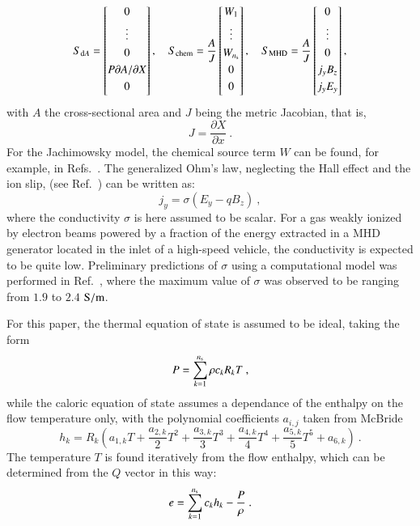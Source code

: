 \documentclass[oneside,10pt,onecolumn]{waflreport}
\newcommand{\ns}{{{n}_{\rm s}}}
\newcommand{\alb}{\vspace{0.1cm}\\} %
\newcommand{\Sda}{S_{{\rm d}A}}
\newcommand{\Schem}{S_{\rm chem}}
\newcommand{\Smhd}{S_{\rm MHD}}
\begin{document}
\begin{equation}
  \Sda=\left[
      \begin{array}{@{}c@{}}
      0 \alb
      \vdots \alb
      0 \alb
      P \partial A / \partial X\alb
      0 \alb
      \end{array}
   \right],~~~~
  \Schem=
   \frac{A}{J}\left[
      \begin{array}{@{}c@{}}
      W_1 \alb
      \vdots \alb
      W_\ns \alb
      0\alb
      0\alb
      \end{array}
   \right],~~~~
  \Smhd=
   \frac{A}{J}\left[
      \begin{array}{@{}c@{}}
      0 \alb
      \vdots \alb
      0 \alb
      j_y B_z\alb
      j_y E_y \alb
      \end{array}
   \right],
\end{equation}
%
with $A$ the cross-sectional area and $J$ being the metric Jacobian, that is,
%
\begin{equation}
  J=\frac{\partial X}{\partial x}~.
  \label{eqn:J}
\end{equation}
%
For the Jachimowsky model, the chemical source term $W$ can be found, for example,
in Refs.\ \cite{thesis:1998:parent,book:1989:anderson}.
The generalized Ohm's law, neglecting the Hall effect and the ion slip, (see Ref.\
\cite{aiaabook:2001:vatazhin,book:1965:sutton}) can be written as:
%
\begin{equation}
  j_y=\sigma \left( E_y - q B_z \right)~,
  \label{eqn:j}
\end{equation}
%
where the conductivity $\sigma$ is here assumed to be scalar. For a gas weakly
ionized by electron beams powered by a fraction of the energy extracted in
a MHD generator located in the inlet of a high-speed vehicle, the conductivity
is expected to be quite low. Preliminary predictions of $\sigma$ using a computational
model was performed in Ref.\ \cite{aiaa:2002:macheret}, where the maximum value
of $\sigma$ was observed to be ranging from $1.9$ to $2.4$ $\rm S/m$.

For this paper, the thermal equation of state is assumed to be ideal, taking the form
%
\begin{equation}
  P=\sum_{k=1}^\ns \rho c_k R_k T~,
  \label{eqn:NS_state}
\end{equation}
%
while the caloric equation of state assumes a dependance of the enthalpy on
the flow temperature only, with the polynomial coefficients $a_{i,j}$
taken from McBride \cite{nasa:1993:mcbride}
%
\begin{equation}
  h_k = R_k \left( a_{1,k} T + \frac{a_{2,k}}{2} T^2 + \frac{a_{3,k}}{3} T^3
                  + \frac{a_{4,k}}{4} T^4 +\frac{a_{5,k}}{5} T^5 + a_{6,k}\right)~.
  \label{eqn:NS_caloric_state}
\end{equation}
%
The temperature $T$ is found iteratively from the flow enthalpy, which can be
determined from the $Q$ vector in this way:
%
\begin{equation}
  e=\sum_{k=1}^\ns c_k h_k-\frac{P}{\rho}~.
  \label{eqn:e}
\end{equation}
%
\end{document}
